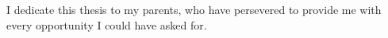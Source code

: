 
\begin{dedication} 

I dedicate this thesis to my parents, who have persevered to provide me with every opportunity I could have asked for.

\end{dedication}

